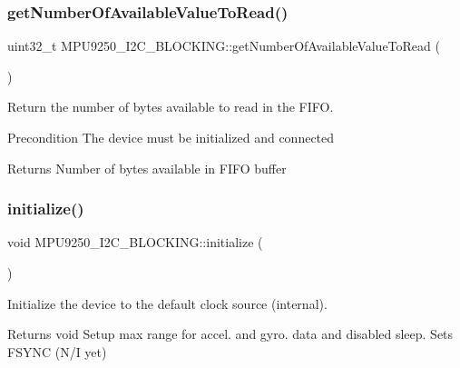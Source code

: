 \subsubsection{\texorpdfstring{get\+Number\+Of\+Available\+Value\+To\+Read()}{getNumberOfAvailableValueToRead()}}
{\footnotesize\ttfamily uint32\+\_\+t M\+P\+U9250\+\_\+\+I2\+C\+\_\+\+B\+L\+O\+C\+K\+I\+N\+G\+::get\+Number\+Of\+Available\+Value\+To\+Read (\begin{DoxyParamCaption}{ }\end{DoxyParamCaption})}



Return the number of bytes available to read in the F\+I\+FO. 

\begin{DoxyPrecond}{Precondition}
The device must be initialized and connected 
\end{DoxyPrecond}
\begin{DoxyReturn}{Returns}
Number of bytes available in F\+I\+FO buffer 
\end{DoxyReturn}
\mbox{\label{class_m_p_u9250___i2_c___b_l_o_c_k_i_n_g_a871c842c9e1a05b345e358f314597d97}} 
\subsubsection{\texorpdfstring{initialize()}{initialize()}}
{\footnotesize\ttfamily void M\+P\+U9250\+\_\+\+I2\+C\+\_\+\+B\+L\+O\+C\+K\+I\+N\+G\+::initialize (\begin{DoxyParamCaption}{ }\end{DoxyParamCaption})}



Initialize the device to the default clock source (internal). 

\begin{DoxyReturn}{Returns}
void Setup max range for accel. and gyro. data and disabled sleep. Sets F\+S\+Y\+NC (N/I yet) 
\end{DoxyReturn}
\mbox{\label{class_m_p_u9250___i2_c___b_l_o_c_k_i_n_g_a8db776173eeac2ea5551cd736ced6427}} 
